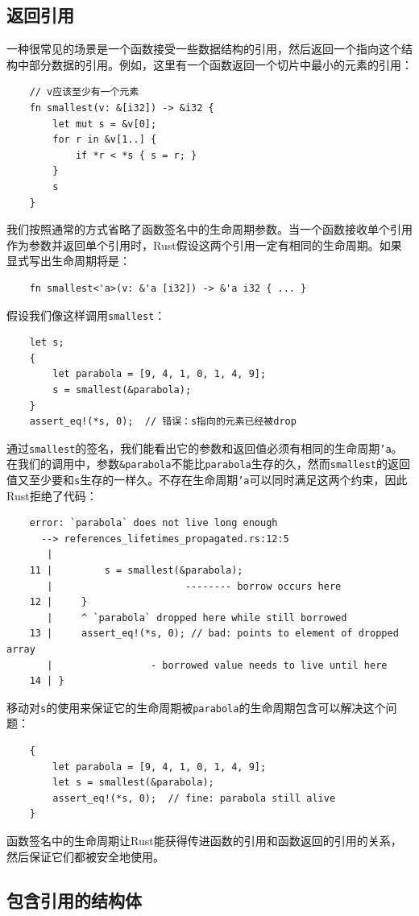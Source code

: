 \subsection{返回引用}
一种很常见的场景是一个函数接受一些数据结构的引用，然后返回一个指向这个结构中部分数据的引用。例如，这里有一个函数返回一个切片中最小的元素的引用：
\begin{verbatim}
    // v应该至少有一个元素
    fn smallest(v: &[i32]) -> &i32 {
        let mut s = &v[0];
        for r in &v[1..] {
            if *r < *s { s = r; }
        }
        s
    }
\end{verbatim}

我们按照通常的方式省略了函数签名中的生命周期参数。当一个函数接收单个引用作为参数并返回单个引用时，Rust假设这两个引用一定有相同的生命周期。如果显式写出生命周期将是：
\begin{verbatim}
    fn smallest<'a>(v: &'a [i32]) -> &'a i32 { ... }
\end{verbatim}

假设我们像这样调用\texttt{smallest}：
\begin{verbatim}
    let s;
    {
        let parabola = [9, 4, 1, 0, 1, 4, 9];
        s = smallest(&parabola);
    }
    assert_eq!(*s, 0);  // 错误：s指向的元素已经被drop
\end{verbatim}

通过\texttt{smallest}的签名，我们能看出它的参数和返回值必须有相同的生命周期\texttt{'a}。在我们的调用中，参数\texttt{\&parabola}不能比\texttt{parabola}生存的久，然而\texttt{smallest}的返回值又至少要和\texttt{s}生存的一样久。不存在生命周期\texttt{'a}可以同时满足这两个约束，因此Rust拒绝了代码：
\begin{verbatim}
    error: `parabola` does not live long enough
      --> references_lifetimes_propagated.rs:12:5
       |
    11 |         s = smallest(&parabola);
       |                       -------- borrow occurs here
    12 |     }
       |     ^ `parabola` dropped here while still borrowed
    13 |     assert_eq!(*s, 0); // bad: points to element of dropped array
       |                 - borrowed value needs to live until here
    14 | }
\end{verbatim}

移动对\texttt{s}的使用来保证它的生命周期被\texttt{parabola}的生命周期包含可以解决这个问题：
\begin{verbatim}
    {
        let parabola = [9, 4, 1, 0, 1, 4, 9];
        let s = smallest(&parabola);
        assert_eq!(*s, 0);  // fine: parabola still alive
    }
\end{verbatim}

函数签名中的生命周期让Rust能获得传进函数的引用和函数返回的引用的关系，然后保证它们都被安全地使用。

\subsection{包含引用的结构体}






















